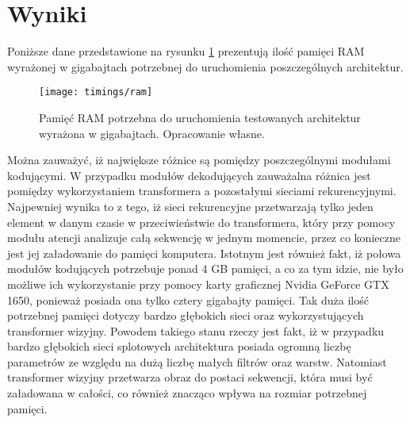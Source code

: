 \newpage %

\section{Wyniki}
Poniższe dane przedstawione na rysunku \ref{fig:memory} prezentują ilość pamięci RAM wyrażonej w gigabajtach potrzebnej do uruchomienia poszczególnych architektur.
\begin{figure}[H]
    \centering
    \texttt{[image: timings/ram]}
    \caption{Pamięć RAM potrzebna do uruchomienia testowanych architektur wyrażona w gigabajtach. Opracowanie własne.}
    \label{fig:memory}
\end{figure}
\noindent Można zauważyć, iż największe różnice są pomiędzy poszczególnymi modułami kodującymi. W przypadku modułów dekodujących zauważalna różnica jest pomiędzy wykorzystaniem transformera a pozostałymi sieciami rekurencyjnymi. Najpewniej wynika to z tego, iż sieci rekurencyjne przetwarzają tylko jeden element w danym czasie w przeciwieństwie do transformera, który przy pomocy modułu atencji analizuje całą sekwencję w jednym momencie, przez co konieczne jest jej załadowanie do pamięci komputera. Istotnym jest również fakt, iż połowa modułów kodujących potrzebuje ponad 4 GB pamięci, a co za tym idzie, nie było możliwe ich wykorzystanie przy pomocy karty graficznej Nvidia GeForce GTX 1650, ponieważ posiada ona tylko cztery gigabajty pamięci. Tak duża ilość potrzebnej pamięci dotyczy bardzo głębokich sieci oraz wykorzystujących transformer wizyjny. Powodem takiego stanu rzeczy jest fakt, iż w przypadku bardzo głębokich sieci splotowych architektura posiada ogromną liczbę parametrów ze względu na dużą liczbę małych filtrów oraz warstw. Natomiast transformer wizyjny przetwarza obraz do postaci sekwencji, która musi być załadowana w całości, co również znacząco wpływa na rozmiar potrzebnej pamięci.

